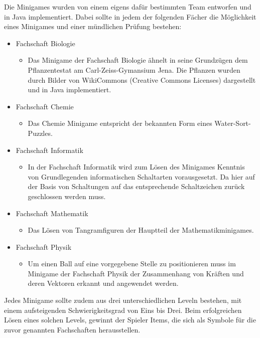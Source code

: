 Die Minigames wurden von einem eigens dafür bestimmten Team entworfen und in Java implementiert. 
Dabei sollte in jedem der folgenden Fächer die Möglichkeit eines Minigames und einer mündlichen Prüfung bestehen:
\begin{itemize}
    \item Fachschaft Biologie
        \begin{itemize}
        \item Das Minigame der Fachschaft Biologie ähnelt in seine Grundzügen dem Pflanzentestat am Carl-Zeiss-Gymansium Jena. Die Pflanzen wurden durch Bilder von WikiCommons (Creative Commons Licenses) dargestellt und in Java implementiert.
        \end{itemize}
    \item Fachschaft Chemie
        \begin{itemize}
        \item Das Chemie Minigame entspricht der bekannten Form eines Water-Sort-Puzzles.
        \end{itemize}
    \item Fachschaft Informatik
        \begin{itemize}
        \item In der Fachschaft Informatik wird zum Lösen des Minigames Kenntnis von Grundlegenden informatischen Schaltarten vorausgesetzt. Da hier auf der Basis von Schaltungen auf das entsprechende Schaltzeichen zurück geschlossen werden muss.
        \end{itemize}
    \item Fachschaft Mathematik
        \begin{itemize}
        \item Das Lösen von Tangramfiguren der Hauptteil der Mathematikminigames.
        \end{itemize}
    \item Fachschaft Physik
        \begin{itemize}
        \item Um einen Ball auf eine vorgegebene Stelle zu positionieren muss im Minigame der Fachschaft Physik der Zusammenhang von Kräften und deren Vektoren erkannt und angewendet werden. 
        \end{itemize}
\end{itemize}

Jedes Minigame sollte zudem aus drei unterschiedlichen Leveln bestehen, mit einem aufsteigenden Schwierigkeitsgrad von Eins bis Drei. Beim erfolgreichen Lösen eines solchen Levels, gewinnt der Spieler Items, die sich als Symbole für die zuvor genannten Fachschaften herausstellen.

